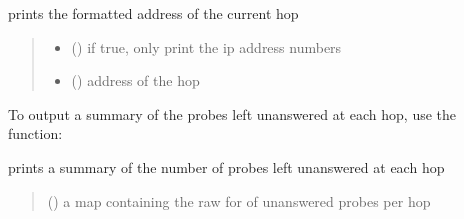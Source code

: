 \documentclass[letterpaper,10pt,english,openany,oneside]{sphinxmanual}
\begin{document}
\begin{fulllineitems}
\label{\detokenize{index:my_traceroute.output}}
\pysigstartsignatures
\pysiglinewithargsret
{}
{\sphinxparamcomma {}}
{}
\pysigstopsignatures
\sphinxAtStartPar
prints the formatted address of the current hop
\begin{quote}\begin{description}
\begin{itemize}
\item {} 
\sphinxAtStartPar
{} () \textendash{} if true, only print the ip address numbers

\item {} 
\sphinxAtStartPar
{} () \textendash{} address of the hop

\end{itemize}

\end{description}\end{quote}

\end{fulllineitems}


\sphinxAtStartPar
To output a summary of the probes left unanswered at each hop, use
the  function:

\begin{fulllineitems}
\label{\detokenize{index:my_traceroute.summarize}}
\pysigstartsignatures
\pysiglinewithargsret
{}
{}
{}
\pysigstopsignatures
\sphinxAtStartPar
prints a summary of the number of probes left unanswered at each hop
\begin{quote}\begin{description}
\sphinxAtStartPar
{} (\sphinxstyleliteralemphasis{\sphinxupquote{, }}) \textendash{} a map containing the raw for of unanswered probes per hop

\end{description}\end{quote}

\end{fulllineitems}
\end{document}
